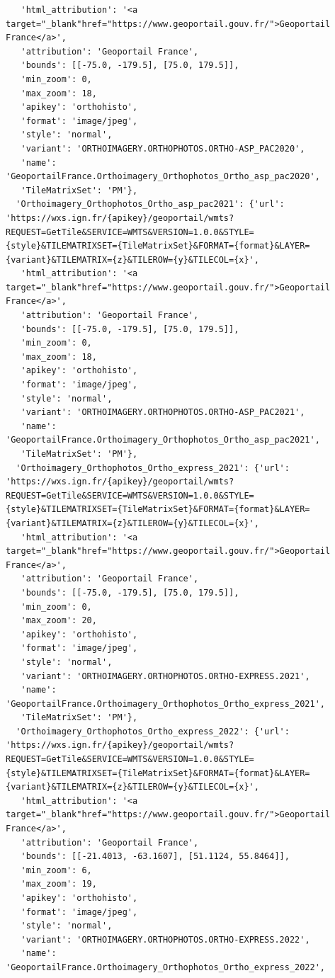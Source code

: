 \documentclass[
  letterpaper,
  DIV=11,
  numbers=noendperiod]{scrreprt}
\begin{document}
\begin{verbatim}
   'html_attribution': '<a target="_blank"href="https://www.geoportail.gouv.fr/">Geoportail France</a>',
   'attribution': 'Geoportail France',
   'bounds': [[-75.0, -179.5], [75.0, 179.5]],
   'min_zoom': 0,
   'max_zoom': 18,
   'apikey': 'orthohisto',
   'format': 'image/jpeg',
   'style': 'normal',
   'variant': 'ORTHOIMAGERY.ORTHOPHOTOS.ORTHO-ASP_PAC2020',
   'name': 'GeoportailFrance.Orthoimagery_Orthophotos_Ortho_asp_pac2020',
   'TileMatrixSet': 'PM'},
  'Orthoimagery_Orthophotos_Ortho_asp_pac2021': {'url': 'https://wxs.ign.fr/{apikey}/geoportail/wmts?REQUEST=GetTile&SERVICE=WMTS&VERSION=1.0.0&STYLE={style}&TILEMATRIXSET={TileMatrixSet}&FORMAT={format}&LAYER={variant}&TILEMATRIX={z}&TILEROW={y}&TILECOL={x}',
   'html_attribution': '<a target="_blank"href="https://www.geoportail.gouv.fr/">Geoportail France</a>',
   'attribution': 'Geoportail France',
   'bounds': [[-75.0, -179.5], [75.0, 179.5]],
   'min_zoom': 0,
   'max_zoom': 18,
   'apikey': 'orthohisto',
   'format': 'image/jpeg',
   'style': 'normal',
   'variant': 'ORTHOIMAGERY.ORTHOPHOTOS.ORTHO-ASP_PAC2021',
   'name': 'GeoportailFrance.Orthoimagery_Orthophotos_Ortho_asp_pac2021',
   'TileMatrixSet': 'PM'},
  'Orthoimagery_Orthophotos_Ortho_express_2021': {'url': 'https://wxs.ign.fr/{apikey}/geoportail/wmts?REQUEST=GetTile&SERVICE=WMTS&VERSION=1.0.0&STYLE={style}&TILEMATRIXSET={TileMatrixSet}&FORMAT={format}&LAYER={variant}&TILEMATRIX={z}&TILEROW={y}&TILECOL={x}',
   'html_attribution': '<a target="_blank"href="https://www.geoportail.gouv.fr/">Geoportail France</a>',
   'attribution': 'Geoportail France',
   'bounds': [[-75.0, -179.5], [75.0, 179.5]],
   'min_zoom': 0,
   'max_zoom': 20,
   'apikey': 'orthohisto',
   'format': 'image/jpeg',
   'style': 'normal',
   'variant': 'ORTHOIMAGERY.ORTHOPHOTOS.ORTHO-EXPRESS.2021',
   'name': 'GeoportailFrance.Orthoimagery_Orthophotos_Ortho_express_2021',
   'TileMatrixSet': 'PM'},
  'Orthoimagery_Orthophotos_Ortho_express_2022': {'url': 'https://wxs.ign.fr/{apikey}/geoportail/wmts?REQUEST=GetTile&SERVICE=WMTS&VERSION=1.0.0&STYLE={style}&TILEMATRIXSET={TileMatrixSet}&FORMAT={format}&LAYER={variant}&TILEMATRIX={z}&TILEROW={y}&TILECOL={x}',
   'html_attribution': '<a target="_blank"href="https://www.geoportail.gouv.fr/">Geoportail France</a>',
   'attribution': 'Geoportail France',
   'bounds': [[-21.4013, -63.1607], [51.1124, 55.8464]],
   'min_zoom': 6,
   'max_zoom': 19,
   'apikey': 'orthohisto',
   'format': 'image/jpeg',
   'style': 'normal',
   'variant': 'ORTHOIMAGERY.ORTHOPHOTOS.ORTHO-EXPRESS.2022',
   'name': 'GeoportailFrance.Orthoimagery_Orthophotos_Ortho_express_2022',

\end{verbatim}
\end{document}
